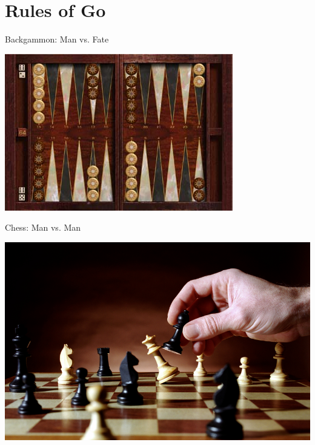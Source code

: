 \documentclass{beamer}
\begin{document}
  \section{Rules of Go}
  {
    \begin{frame}[standout]
      \begin{center}
        Backgammon: Man vs. Fate

        \includegraphics[height=.4\textheight]{../img/backgammon.jpg}
        \pause

        Chess: Man vs. Man

        \includegraphics[height=.4\textheight]{../img/chess.jpg}
      \end{center}
    \end{frame}
  }
\end{document}

